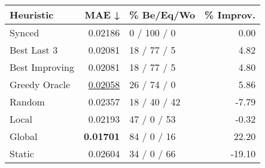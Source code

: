 \begin{tabular}{lrlr}
\toprule
\textbf{Heuristic} & \textbf{MAE ↓} & \textbf{\% Be/Eq/Wo} & \textbf{\% Improv.} \\
\midrule
            Synced &        0.02186 &          0 / 100 / 0 &                0.00 \\
\midrule
       Best Last 3 &        0.02081 &          18 / 77 / 5 &                4.82 \\
    Best Improving &        0.02081 &          18 / 77 / 5 &                4.80 \\
\addlinespace
     Greedy Oracle &        \underline{0.02058} &          26 / 74 / 0 &                5.86 \\
            Random &        0.02357 &         18 / 40 / 42 &               -7.79 \\
\midrule
             Local &        0.02193 &          47 / 0 / 53 &               -0.32 \\
            Global &        \textbf{0.01701} &          84 / 0 / 16 &               22.20 \\
\midrule
            Static &        0.02604 &          34 / 0 / 66 &              -19.10 \\
\bottomrule
\end{tabular}

\label{tab:non_lr05_le1_bs4_Summary}
